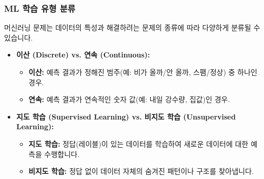 \documentclass[11pt,a4paper]{article}
\begin{document}
\subsubsection*{ML 학습 유형 분류}
머신러닝 문제는 데이터의 특성과 해결하려는 문제의 종류에 따라 다양하게 분류될 수 있습니다.
\begin{itemize}
    \item \textbf{이산 (Discrete) vs. 연속 (Continuous):}
    \begin{itemize}
        \item \textbf{이산:} 예측 결과가 정해진 범주(예: 비가 올까/안 올까, 스팸/정상) 중 하나인 경우.
        \item \textbf{연속:} 예측 결과가 연속적인 숫자 값(예: 내일 강수량, 집값)인 경우.
    \end{itemize}
    \item \textbf{지도 학습 (Supervised Learning) vs. 비지도 학습 (Unsupervised Learning):}
    \begin{itemize}
        \item \textbf{지도 학습:} 정답(레이블)이 있는 데이터를 학습하여 새로운 데이터에 대한 예측을 수행합니다.
        \item \textbf{비지도 학습:} 정답 없이 데이터 자체의 숨겨진 패턴이나 구조를 찾아냅니다.
    \end{itemize}
\end{itemize}
\end{document}
